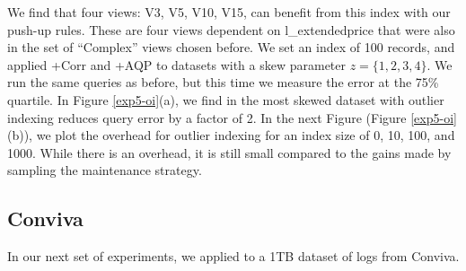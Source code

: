 We find that four views: V3, V5, V10, V15, can benefit from this index with our push-up rules. 
These are four views dependent on \textsf{l\_extendedprice} that were also in the set of ``Complex'' views chosen before.
We set an index of 100 records, and applied \svcnospace+Corr and \svcnospace+AQP to datasets with a skew parameter $z=\{1,2,3,4\}$. 
We run the same queries as before, but this time we measure the error at the 75\% quartile.
In Figure \ref{exp5-oi}(a), we find in the most skewed dataset \svc with outlier indexing reduces query error by a factor of 2.
In the next Figure \big(Figure \ref{exp5-oi} (b)\big), we plot the overhead for outlier indexing for an index size of 0, 10, 100, and 1000.
While there is an overhead, it is still small compared to the gains made by sampling the maintenance strategy.

\subsection{Conviva}
In our next set of experiments, we applied \svc to a 1TB dataset of logs from Conviva.
